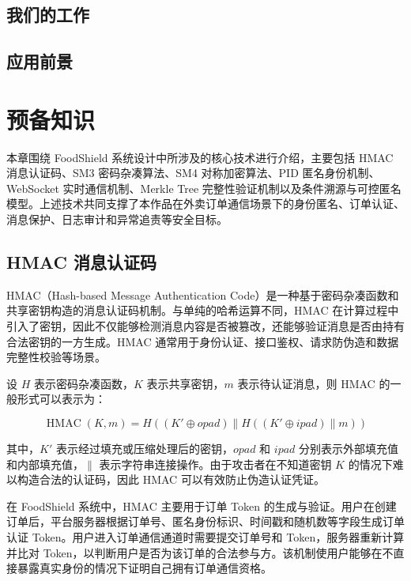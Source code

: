 \documentclass[UTF8,a4paper,zihao=-4,fontset=fandol]{ctexart}
\begin{document}
\subsection{我们的工作}

\subsection{应用前景}

\newpage
\section{预备知识}

本章围绕 FoodShield 系统设计中所涉及的核心技术进行介绍，主要包括 HMAC 消息认证码、SM3 密码杂凑算法、SM4 对称加密算法、PID 匿名身份机制、WebSocket 实时通信机制、Merkle Tree 完整性验证机制以及条件溯源与可控匿名模型。上述技术共同支撑了本作品在外卖订单通信场景下的身份匿名、订单认证、消息保护、日志审计和异常追责等安全目标。

\subsection{HMAC 消息认证码}

HMAC（Hash-based Message Authentication Code）是一种基于密码杂凑函数和共享密钥构造的消息认证码机制。与单纯的哈希运算不同，HMAC 在计算过程中引入了密钥，因此不仅能够检测消息内容是否被篡改，还能够验证消息是否由持有合法密钥的一方生成。HMAC 通常用于身份认证、接口鉴权、请求防伪造和数据完整性校验等场景。

设 $H$ 表示密码杂凑函数，$K$ 表示共享密钥，$m$ 表示待认证消息，则 HMAC 的一般形式可以表示为：

\begin{equation}
\operatorname{HMAC}(K,m)=H((K' \oplus opad)\parallel H((K' \oplus ipad)\parallel m))
\end{equation}

其中，$K'$ 表示经过填充或压缩处理后的密钥，$opad$ 和 $ipad$ 分别表示外部填充值和内部填充值，$\parallel$ 表示字符串连接操作。由于攻击者在不知道密钥 $K$ 的情况下难以构造合法的认证码，因此 HMAC 可以有效防止伪造认证凭证。

在 FoodShield 系统中，HMAC 主要用于订单 Token 的生成与验证。用户在创建订单后，平台服务器根据订单号、匿名身份标识、时间戳和随机数等字段生成订单认证 Token。用户进入订单通信通道时需要提交订单号和 Token，服务器重新计算并比对 Token，以判断用户是否为该订单的合法参与方。该机制使用户能够在不直接暴露真实身份的情况下证明自己拥有订单通信资格。
\end{document}
